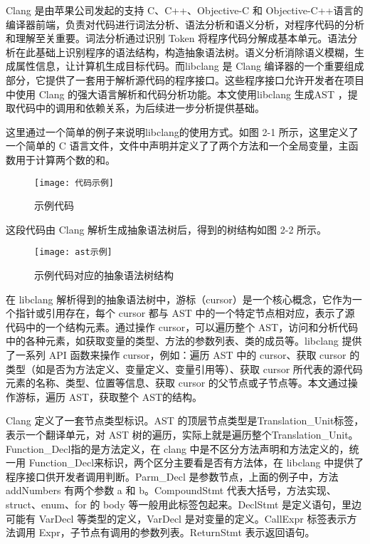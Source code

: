 Clang 是由苹果公司发起的支持 C、C++、Objective-C 和 Objective-C++语言的编译器前端，负责对代码进行词法分析、语法分析和语义分析，对程序代码的分析和理解至关重要\cite{clang}。词法分析通过识别 Token 将程序代码分解成基本单元。语法分析在此基础上识别程序的语法结构，构造抽象语法树。语义分析消除语义模糊，生成属性信息，让计算机生成目标代码。而libclang 是 Clang 编译器的一个重要组成部分，它提供了一套用于解析源代码的程序接口。这些程序接口允许开发者在项目中使用 Clang 的强大语言解析和代码分析功能\cite{libclang}。本文使用libclang 生成AST ，提取代码中的调用和依赖关系，为后续进一步分析提供基础。


这里通过一个简单的例子来说明libclang的使用方式。如图 2-1 所示，这里定义了一个简单的 C 语言文件，文件中声明并定义了了两个方法和一个全局变量，主函数用于计算两个数的和。

\begin{figure}[h]
\centering
\texttt{[image: 代码示例]}
\caption{示例代码}
\end{figure}


这段代码由 Clang 解析生成抽象语法树后，得到的树结构如图 2-2 所示。

\begin{figure}[h]
\centering
\texttt{[image: ast示例]}
\caption{示例代码对应的抽象语法树结构}
\end{figure}

在 libclang 解析得到的抽象语法树中，游标（cursor）是一个核心概念，它作为一个指针或引用存在，每个 cursor 都与 AST 中的一个特定节点相对应，表示了源代码中的一个结构元素。通过操作 cursor，可以遍历整个 AST，访问和分析代码中的各种元素，如获取变量的类型、方法的参数列表、类的成员等。libclang 提供了一系列 API 函数来操作 cursor，例如：遍历 AST 中的 cursor、获取 cursor 的类型（如是否为方法定义、变量定义、变量引用等）、获取 cursor 所代表的源代码元素的名称、类型、位置等信息、获取 cursor 的父节点或子节点等。本文通过操作游标，遍历 AST，获取整个 AST的结构。


Clang 定义了一套节点类型标识。AST 的顶层节点类型是Translation\_Unit标签，表示一个翻译单元，对 AST 树的遍历，实际上就是遍历整个Translation\_Unit。Function\_Decl指的是方法定义，在 clang 中是不区分方法声明和方法定义的，统一用 Function\_Decl来标识，两个区分主要看是否有方法体，在 libclang 中提供了程序接口供开发者调用判断。Parm\_Decl 是参数节点，上面的例子中，方法 addNumbers 有两个参数 a 和 b。CompoundStmt 代表大括号，方法实现、struct、enum、for 的 body 等一般用此标签包起来。DeclStmt 是定义语句，里边可能有 VarDecl 等类型的定义，VarDecl 是对变量的定义。CallExpr 标签表示方法调用 Expr，子节点有调用的参数列表。ReturnStmt 表示返回语句。


